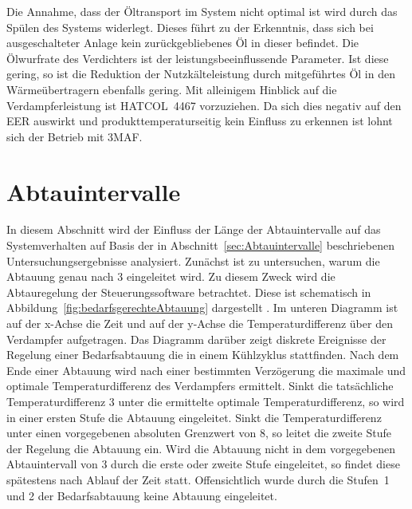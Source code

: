 Die Annahme, dass der Öltransport im System nicht optimal ist wird durch das Spülen des Systems widerlegt. Dieses führt zu der Erkenntnis, dass sich bei ausgeschalteter Anlage kein zurückgebliebenes Öl in dieser befindet. Die Ölwurfrate des Verdichters ist der leistungsbeeinflussende Parameter. Ist diese gering, so ist die Reduktion der Nutzkälteleistung durch mitgeführtes Öl in den Wärmeübertragern ebenfalls gering. \newline
Mit alleinigem Hinblick auf die Verdampferleistung ist HATCOL~4467 vorzuziehen.
Da sich dies negativ auf den EER auswirkt und produkttemperaturseitig kein Einfluss zu erkennen ist lohnt sich der Betrieb mit 3MAF.





\clearpage




\section{Abtauintervalle}
\label{sec:AbtauintervalleAnalyse}

In diesem Abschnitt wird der Einfluss der Länge der Abtauintervalle auf das Systemverhalten auf Basis der in Abschnitt~\ref{sec:Abtauintervalle} beschriebenen Untersuchungsergebnisse analysiert. \newline
Zunächst ist zu untersuchen, warum die Abtauung genau nach \unit{3}{\hour} eingeleitet wird. Zu diesem Zweck wird die Abtauregelung der Steuerungssoftware betrachtet. Diese ist schematisch in Abbildung~\ref{fig:bedarfsgerechteAbtauung} dargestellt \cite{EmersonClimateTechnologies.2017}. Im unteren Diagramm ist auf der x-Achse die Zeit und auf der y-Achse die Temperaturdifferenz über den Verdampfer aufgetragen. Das Diagramm darüber zeigt diskrete Ereignisse  der Regelung einer Bedarfsabtauung die in einem Kühlzyklus stattfinden.
Nach dem Ende einer Abtauung wird nach einer bestimmten Verzögerung die maximale und optimale Temperaturdifferenz des Verdampfers ermittelt. Sinkt die tatsächliche Temperaturdifferenz \unit{3}{\kelvin} unter die ermittelte optimale Temperaturdifferenz, so wird in einer ersten Stufe die Abtauung eingeleitet. Sinkt die Temperaturdifferenz unter einen vorgegebenen absoluten Grenzwert von \unit{8}{\kelvin}, so leitet die zweite Stufe der Regelung die Abtauung ein. Wird die Abtauung nicht in dem vorgegebenen Abtauintervall von \unit{3}{\hour} durch die erste oder zweite Stufe eingeleitet, so findet diese spätestens nach Ablauf der Zeit statt. Offensichtlich wurde durch die Stufen~1 und 2 der Bedarfsabtauung keine Abtauung eingeleitet. 

